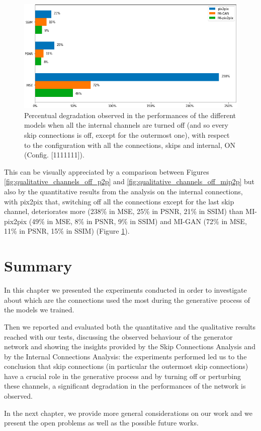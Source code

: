 \begin{figure}
\centering
\includegraphics[width=0.635\textheight]{images/barplot_2.pdf}
\caption[Percentual degradation in the performances of different models]{Percentual degradation observed in the performances of the different models when all the internal channels are turned off (and so every skip connections is off, except for the outermost one), with respect to the configuration with all the connections, skips and internal, ON (Config. [1111111]).}
\label{fig:barplot_2}
\end{figure}

This can be visually appreciated by a comparison between Figures \ref{fig:qualitative_channels_off_p2p} and \ref{fig:qualitative_channels_off_mip2p} but also by the quantitative results from the analysis on the internal connections, with pix2pix that, switching off all the connections except for the last skip channel, deteriorates more (238\% in MSE, 25\% in PSNR, 21\% in SSIM) than MI-pix2pix (49\% in MSE, 8\% in PSNR, 9\% in SSIM) and MI-GAN (72\% in MSE, 11\% in PSNR, 15\% in SSIM) (Figure \ref{fig:barplot_2}).


\section{Summary}
\label{sec:6th_section_summary}
In this chapter we presented the experiments conducted in order to investigate about which are the connections used the most during the generative process of the models we trained.

Then we reported and evaluated both the quantitative and the qualitative results reached with our tests, discussing the observed behaviour of the generator network and showing the insights provided by the Skip Connections Analysis and by the Internal Connections Analysis: the experiments performed led us to the conclusion that skip connections (in particular the outermost skip connections) have a crucial role in the generative process and by turning off or perturbing these channels, a significant degradation in the performances of the network is observed.

\vspace{5mm}
In the next chapter, we provide more general considerations on our work and we present the open problems as well as the possible future works.
